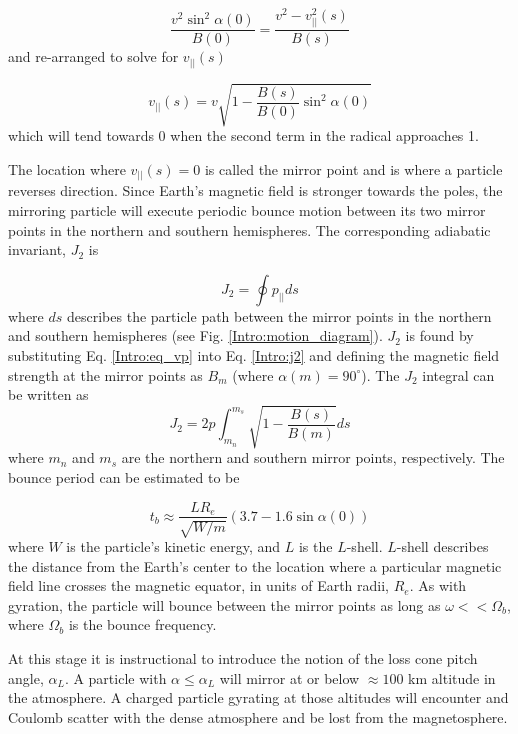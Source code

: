 \begin{equation}
\frac{v^2 \sin^2{\alpha(0)}}{B(0)} = \frac{v^2 - v^2_{||}(s)}{B(s)}
\end{equation} and re-arranged to solve for $v_{||}(s)$

\begin{equation} \label{Intro:eq_vp} 
v_{||}(s) = v \sqrt{1 - \frac{B(s)}{B(0)} \sin^2{\alpha(0)}}
\end{equation} which will tend towards 0 when the second term in the radical approaches 1.

The location where $v_{||}(s) = 0$ is called the mirror point and is where a particle reverses direction. Since Earth's magnetic field is stronger towards the poles, the mirroring particle will execute periodic bounce motion between its two mirror points in the northern and southern hemispheres. The corresponding adiabatic invariant, $J_2$ is

\begin{equation} \label{Intro:j2}
J_2 = \oint p_{||} ds
\end{equation} where $ds$ describes the particle path between the mirror points in the northern and southern hemispheres (see Fig. \ref{Intro:motion_diagram}). $J_2$ is found by substituting Eq. \ref{Intro:eq_vp} into Eq. \ref{Intro:j2} and defining the magnetic field strength at the mirror points as $B_m$ (where $\alpha(m) = 90^\circ$). The $J_2$ integral can be written as     
\begin{equation}
J_2 = 2 p \int_{m_n}^{m_s} \sqrt{1 - \frac{B(s)}{B(m)}} ds
\end{equation} where $m_n$ and $m_s$ are the northern and southern mirror points, respectively. The bounce period can be estimated \citep[e.g.][]{Baumjohann1997} to be 

\begin{equation}
t_b \approx \frac{L R_e}{\sqrt{W/m}} (3.7 - 1.6 \sin{\alpha(0)})
\end{equation} where $W$ is the particle's kinetic energy, and $L$ is the $L$-shell. $L$-shell describes the distance from the Earth's center to the location where a particular magnetic field line crosses the magnetic equator, in units of Earth radii, $R_e$. As with gyration, the particle will bounce between the mirror points as long as $\omega << \Omega_b$, where $\Omega_b$ is the bounce frequency.

At this stage it is instructional to introduce the notion of the loss cone pitch angle, $\alpha_L$.  A particle with $\alpha \leq \alpha_L$ will mirror at or below $\approx 100$ km altitude in the atmosphere. A charged particle gyrating at those altitudes will encounter and Coulomb scatter with the dense atmosphere and be lost from the magnetosphere.

